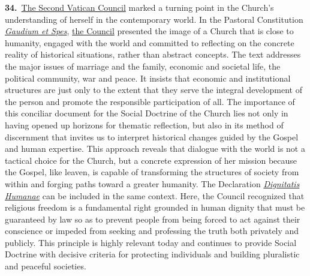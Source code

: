 \documentclass{article}
\begin{document}
\textbf{34.}\ \href{https://www.vatican.va/archive/hist_councils/ii_vatican_council/index.htm}{The Second Vatican Council} marked a turning point in the Church's understanding of herself in the contemporary world. In the Pastoral Constitution \href{https://www.vatican.va/archive/hist_councils/ii_vatican_council/documents/vat-ii_const_19651207_gaudium-et-spes_en.html}{\emph{Gaudium et Spes}}, \href{https://www.vatican.va/archive/hist_councils/ii_vatican_council/index.htm}{the Council} presented the image of a Church that is close to humanity, engaged with the world and committed to reflecting on the concrete reality of historical situations, rather than abstract concepts. The text addresses the major issues of marriage and the family, economic and societal life, the political community, war and peace. It insists that economic and institutional structures are just only to the extent that they serve the integral development of the person and promote the responsible participation of all.\cite{n29} The importance of this conciliar document for the Social Doctrine of the Church lies not only in having opened up horizons for thematic reflection, but also in its method of discernment that invites us to interpret historical changes guided by the Gospel and human expertise. This approach reveals that dialogue with the world is not a tactical choice for the Church, but a concrete expression of her mission because the Gospel, like leaven, is capable of transforming the structures of society from within and forging paths toward a greater humanity. The Declaration \href{https://www.vatican.va/archive/hist_councils/ii_vatican_council/documents/vat-ii_decl_19651207_dignitatis-humanae_en.html}{\emph{Dignitatis Humanae}} can be included in the same context. Here, the Council recognized that religious freedom is a fundamental right grounded in human dignity that must be guaranteed by law so as to prevent people from being forced to act against their conscience or impeded from seeking and professing the truth both privately and publicly.\cite{n30} This principle is highly relevant today and continues to provide Social Doctrine with decisive criteria for protecting individuals and building pluralistic and peaceful societies.
\end{document}
